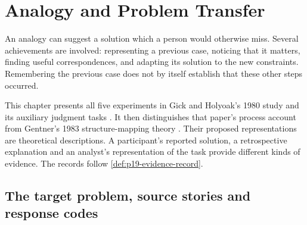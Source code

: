 \chapter{Analogy and Problem Transfer}
\label{sec:p19-analogy-and-problem-transfer}

An analogy can suggest a solution which a person would otherwise
miss. Several achievements are involved: representing a previous
case, noticing that it matters, finding useful correspondences,
and adapting its solution to the new constraints. Remembering
the previous case does not by itself establish that these other
steps occurred.

This chapter presents all five experiments in Gick and Holyoak's
1980 study and its auxiliary judgment tasks
\cite{GickHolyoak1980AnalogicalProblemSolving}. It then distinguishes
that paper's process account from Gentner's 1983 structure-mapping
theory \cite{Gentner1983StructureMapping}. Their proposed
representations are theoretical descriptions. A participant's
reported solution, a retrospective explanation and an analyst's
representation of the task provide different kinds of evidence.
The records follow \cref{def:p19-evidence-record}.

\section{The target problem, source stories and response codes}
\label{sec:p19-analogy-tasks}

